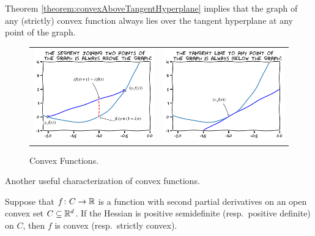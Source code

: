 \begin{remark}
Theorem \ref{theorem:convexAboveTangentHyperplane} implies that the graph of any (strictly) convex function always lies over the tangent hyperplane at any point of the graph.
\begin{figure}[ht!]
\begin{tabular}{cc}
\includegraphics[width=0.5\linewidth]{convexFunction1.png} &
\includegraphics[width=0.5\linewidth]{convexFunction2.png}
\end{tabular}
\caption{Convex Functions.}
\label{figure:convexFunction}
\end{figure}
\end{remark}

Another useful characterization of convex functions.
\begin{theorem}
Suppose that $f\colon C \to \mathbb{R}$ is a function with second partial derivatives on an open convex set $C \subseteq \mathbb{R}^d$.  If the Hessian is positive semidefinite (resp.~positive definite) on $C$, then $f$ is convex (resp.~strictly convex).
\end{theorem}

